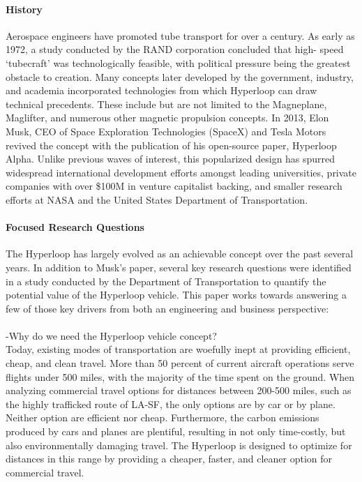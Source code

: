 \paragraph{History}

	Aerospace engineers have promoted tube transport for over a century. 
	As early as 1972, a study conducted by the RAND corporation concluded that high-
	speed `tubecraft' was technologically feasible, with political pressure being the greatest
	obstacle to creation.\cite{RAND} Many concepts later developed by
	the government, industry, and academia incorporated technologies from which
	Hyperloop can draw technical precedents.
	These include but are not limited to the Magneplane, Maglifter, and numerous
	other magnetic propulsion concepts. In 2013, Elon Musk, CEO of Space Exploration
	Technologies (SpaceX) and Tesla Motors revived the concept with the publication
	of his open-source paper, Hyperloop Alpha.\cite{Musk}
	Unlike previous waves of interest, this popularized design has spurred widespread international
	development efforts amongst leading universities, private companies with over
	\$100M in venture capitalist backing, and smaller research efforts at NASA and the
	United States Department of Transportation. \cite{Chin}

\paragraph{Focused Research Questions}

	The Hyperloop has largely evolved as an achievable concept over the past several years.
	In addition to Musk's paper, several key research questions were identified in a study conducted
	by the Department of Transportation to quantify the potential value of the
	Hyperloop vehicle. \cite{Volpe} This paper works towards answering a few of
	those key drivers from both an engineering and business perspective:\\

	\\
	-Why do we need the Hyperloop vehicle concept?\\

	Today, existing modes of transportation are woefully inept at providing efficient, cheap, and
	clean travel. More than 50 percent of current aircraft operations serve flights under 500
	miles, with the majority of the time spent on the ground. When analyzing commercial
	travel options for distances between 200-500 miles, such as the highly trafficked route of LA-SF,
	the only options are by car or by plane. Neither option are efficient nor cheap. Furthermore,
	the carbon emissions produced by cars and planes are plentiful, resulting in not only
	time-costly, but also environmentally damaging travel. The Hyperloop is designed to
	optimize for distances in this range by providing a cheaper, faster, and cleaner
	option for commercial travel.

